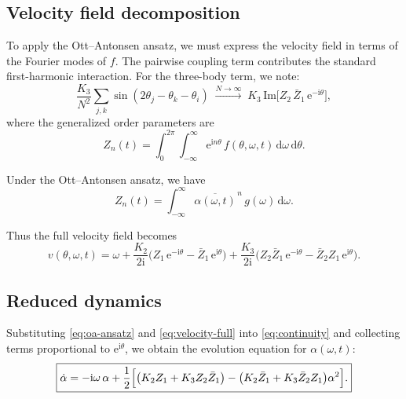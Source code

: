 \documentclass{article}
\newcommand{\dd}{\mathrm{d}}
\newcommand{\ii}{\mathrm{i}}
\newcommand{\ee}{\mathrm{e}}
\begin{document}
\subsection{Velocity field decomposition}

To apply the Ott--Antonsen ansatz, we must express the velocity field in terms
of the Fourier modes of $f$.  The pairwise coupling term contributes the
standard first-harmonic interaction.  For the three-body term, we note:
\begin{equation}
  \frac{K_3}{N^2}\sum_{j,k}\sin(2\theta_j - \theta_k - \theta_i)
  \;\xrightarrow{N\to\infty}\;
  K_3\,\mathrm{Im}\bigl[Z_2\,\bar{Z}_1\,\ee^{-\ii\theta}\bigr],
  \label{eq:triplet-mf}
\end{equation}
where the generalized order parameters are
\begin{equation}
  Z_n(t) = \int_0^{2\pi}\!\int_{-\infty}^{\infty}
  \ee^{\ii n\theta}\,f(\theta,\omega,t)\,\dd\omega\,\dd\theta.
  \label{eq:gen-order-param}
\end{equation}

Under the Ott--Antonsen ansatz, we have
\begin{equation}
  Z_n(t) = \int_{-\infty}^{\infty}\overline{\alpha(\omega,t)}^{\,n}\,g(\omega)\,\dd\omega.
  \label{eq:Zn-oa}
\end{equation}

Thus the full velocity field becomes
\begin{equation}
  v(\theta,\omega,t) = \omega
  + \frac{K_2}{2\ii}\bigl(Z_1\,\ee^{-\ii\theta} - \bar{Z}_1\,\ee^{\ii\theta}\bigr)
  + \frac{K_3}{2\ii}\bigl(Z_2\bar{Z}_1\,\ee^{-\ii\theta}
    - \bar{Z}_2 Z_1\,\ee^{\ii\theta}\bigr).
  \label{eq:velocity-full}
\end{equation}

\subsection{Reduced dynamics}

Substituting \eqref{eq:oa-ansatz} and \eqref{eq:velocity-full} into
\eqref{eq:continuity} and collecting terms proportional to $\ee^{\ii\theta}$,
we obtain the evolution equation for $\alpha(\omega,t)$:
\begin{equation}
  \boxed{
  \dot{\alpha} = -\ii\omega\,\alpha
  + \frac{1}{2}\Bigl[
    \bigl(K_2 Z_1 + K_3 Z_2\bar{Z}_1\bigr)
    - \bigl(K_2\bar{Z}_1 + K_3\bar{Z}_2 Z_1\bigr)\alpha^2
  \Bigr].
  }
  \label{eq:alpha-ode}
\end{equation}
\end{document}
